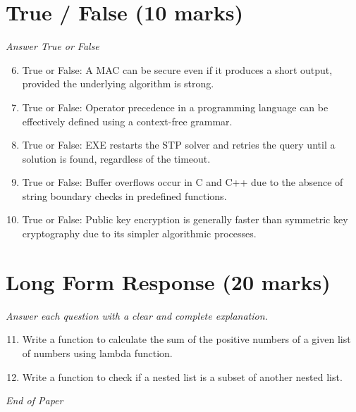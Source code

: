 \documentclass[12pt]{article}
\begin{document}
\section*{True / False (10 marks)}
\textit{Answer True or False}
\begin{enumerate}[label=\arabic*.]
\setcounter{enumi}{5}
\item True or False: A MAC can be secure even if it produces a short output, provided the underlying algorithm is strong.
\item True or False: Operator precedence in a programming language can be effectively defined using a context-free grammar.
\item True or False: EXE restarts the STP solver and retries the query until a solution is found, regardless of the timeout.
\item True or False: Buffer overflows occur in C and C++ due to the absence of string boundary checks in predefined functions.
\item True or False: Public key encryption is generally faster than symmetric key cryptography due to its simpler algorithmic processes.
\end{enumerate}

\section*{Long Form Response (20 marks)}
\textit{Answer each question with a clear and complete explanation.}
\begin{enumerate}[label=\arabic*.]
\setcounter{enumi}{10}
\item Write a function to calculate the sum of the positive numbers of a given list of numbers using lambda function.
\item Write a function to check if a nested list is a subset of another nested list.
\end{enumerate}

\vfill
\noindent\textit{End of Paper}
\end{document}
